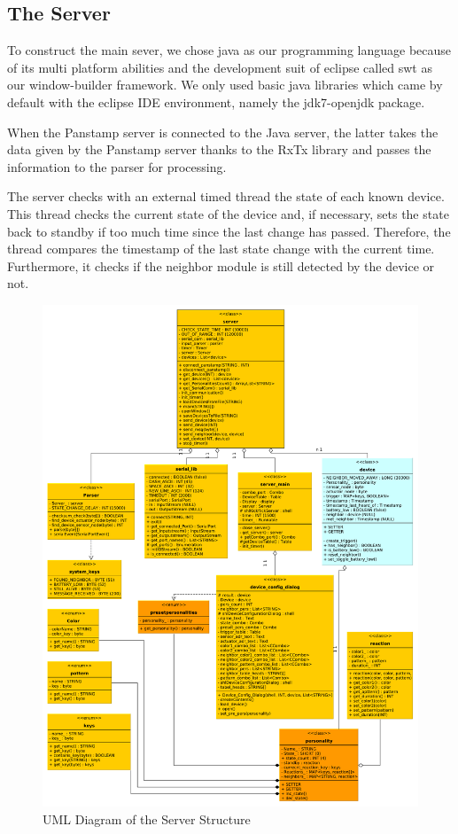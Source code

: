 \subsection{The Server}
To construct the main sever, we chose java\cite{java} as our
programming language because of its multi platform abilities and the development
suit of eclipse\cite{eclipse} called swt\cite{swt} as our window-builder framework. We only used basic java libraries which came by default
with the eclipse IDE\cite{ide} environment, namely the
jdk7-openjdk\cite{open_jdk} package. 

When the Panstamp server is connected to the Java server, the latter takes the data given by the Panstamp server thanks to the RxTx library \cite{rxtx} and passes the information to the parser for processing. 

The server checks with an external timed thread the state of each known device.
This thread checks the current state of the device and, if necessary, sets the
state back to standby if too much time since the last change has passed. Therefore,
the thread compares the timestamp of the last state change with the current
time. Furthermore, it checks if the neighbor module is still detected by the device or not.

\begin{figure}[ht]
	\centerline{\includegraphics[width=\textwidth]{./graph/general.pdf}}
	\caption{UML Diagram of the Server Structure}
	\label{fig:server_uml}
\end{figure}


